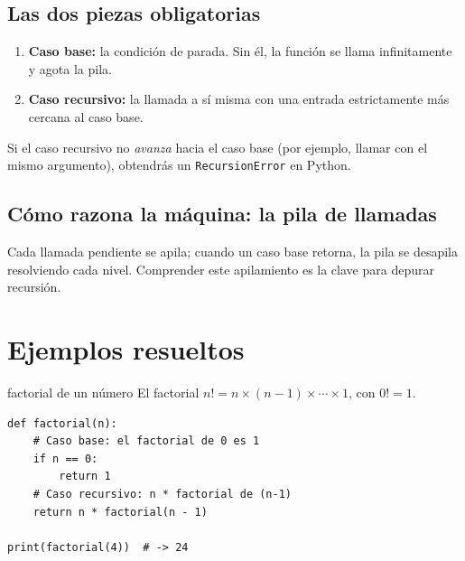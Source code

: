 \documentclass[11pt,a4paper]{article}
\begin{document}
\subsection{Las dos piezas obligatorias}

\begin{enumerate}[leftmargin=1.6em]
  \item \textbf{Caso base:} la condición de parada. Sin él, la función se llama
        infinitamente y agota la pila.
  \item \textbf{Caso recursivo:} la llamada a sí misma con una entrada
        estrictamente más cercana al caso base.
\end{enumerate}

\begin{advertencia}
Si el caso recursivo no \emph{avanza} hacia el caso base (por ejemplo, llamar
con el mismo argumento), obtendrás un \texttt{RecursionError} en Python.
\end{advertencia}

\subsection{Cómo razona la máquina: la pila de llamadas}

Cada llamada pendiente se apila; cuando un caso base retorna, la pila se
desapila resolviendo cada nivel. Comprender este apilamiento es la clave para
depurar recursión.

\section{Ejemplos resueltos}

\begin{ejemplo}{factorial de un número}
El factorial $n! = n \times (n-1) \times \cdots \times 1$, con $0! = 1$.
\end{ejemplo}

\begin{lstlisting}
def factorial(n):
    # Caso base: el factorial de 0 es 1
    if n == 0:
        return 1
    # Caso recursivo: n * factorial de (n-1)
    return n * factorial(n - 1)

print(factorial(4))  # -> 24
\end{lstlisting}
\end{document}
